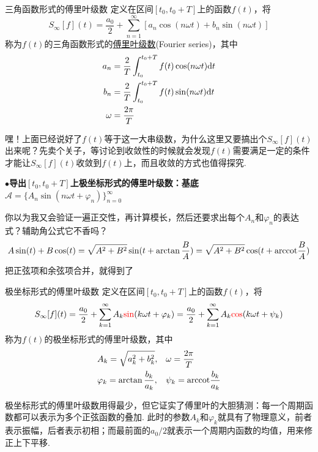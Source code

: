 \documentclass[main.tex]{subfiles}
\begin{document}
\begin{definition}{三角函数形式的傅里叶级数}
    定义在区间\([t_0,t_0+T]\)上的函数\(f(t)\)，将
    \[S_{\infty}[f](t) = \frac{a_0}{2}+\sum_{n=1}^{\infty} \left[a_n\cos(n\omega t)+b_n\sin(n\omega t)\right]\]
    称为\(f(t)\)的三角函数形式的\uline{傅里叶级数}(Fourier series)，其中
    \begin{align*}
        a_n &= \frac{2}{T}\int_{t_0}^{t_0+T} f(t)\cos(n\omega t){\rm d}t \\
        b_n &= \frac{2}{T}\int_{t_0}^{t_0+T} f(t)\sin(n\omega t){\rm d}t \\
        \omega &= \frac{2\pi}{T}
    \end{align*}
\end{definition}

嘿！上面已经说好了\(f(t)\)等于这一大串级数，为什么这里又要搞出个\(S_{\infty}[f](t)\)出来呢？先卖个关子，等讨论到收敛性的时候就会发现\(f(t)\)需要满足一定的条件才能让\(S_{\infty}[f](t)\)收敛到\(f(t)\)上，而且收敛的方式也值得探究.

\vspace{1cm}
\noindent \textbf{
\(\bullet\)导出\([t_0, t_0+T]\)上极坐标形式的傅里叶级数：基底\(\mathcal{A}=\{A_n\sin(n\omega t+\varphi_n)\}_{n=0}^{\infty}\)
}

你以为我又会验证一遍正交性，再计算模长，然后还要求出每个\(A_n\)和\(\varphi_n\)的表达式？辅助角公式它不香吗？
\[A\sin(t)+B\cos(t)=\sqrt{A^2+B^2}\sin(t+\arctan\frac{B}{A}) = \sqrt{A^2+B^2}\cos(t+{\rm arccot}\frac{B}{A})\]
把正弦项和余弦项合并，就得到了
\begin{definition}{极坐标形式的傅里叶级数}
    定义在区间\([t_0,t_0+T]\)上的函数\(f(t)\)，将
    \[S_{\infty}[f](t) = \frac{a_0}{2}+\sum_{k=1}^{\infty} A_k{\color{red}\sin}(k\omega t+\varphi_k) = \frac{a_0}{2}+\sum_{k=1}^{\infty} A_k{\color{red}\cos}(k\omega t+\psi_k)\]
    称为\(f(t)\)的极坐标形式的傅里叶级数，其中
    \[
        \begin{aligned}
            & A_k = \sqrt{a_k^2+b_k^2},  && \omega = \frac{2\pi}{T} \\
            & \varphi_k = \arctan\frac{b_k}{a_k}, && \psi_k = {\rm arccot}\frac{b_k}{a_k}
        \end{aligned}
    \]
\end{definition}

极坐标形式的傅里叶级数用得最少，但它证实了傅里叶的大胆猜测：每一个周期函数都可以表示为多个正弦函数的叠加. 此时的参数\(A_k\)和\(\varphi_k\)就具有了物理意义，前者表示振幅，后者表示初相；而最前面的\(a_0/2\)就表示一个周期内函数的均值，用来修正上下平移.
\end{document}

